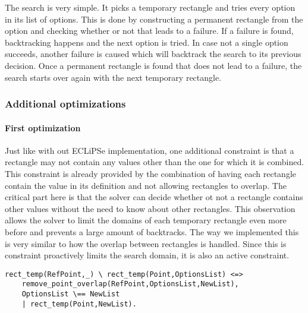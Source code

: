 The search is very simple. It picks a temporary rectangle and tries every option in its list of options. This is done by constructing a permanent rectangle from the option and checking whether or not that leads to a failure. If a failure is found, backtracking happens and the next option is tried. In case not a single option succeeds, another failure is caused which will backtrack the search to its previous decision. Once a permanent rectangle is found that does not lead to a failure, the search starts over again with the next temporary rectangle.


\subsubsection{Additional optimizations}
\paragraph{First optimization}
\label{sec:CHR_opti}
Just like with out ECLiPSe implementation, one additional constraint is that a rectangle may not contain any values other than the one for which it is combined. This constraint is already provided by the combination of having each rectangle contain the value in its definition and not allowing rectangles to overlap. The critical part here is that the solver can decide whether ot not a rectangle contains other values without the need to know about other rectangles. This observation allows the solver to limit the domains of each temporary rectangle even more before and prevents a large amount of backtracks. The way we implemented this is very similar to how the overlap between rectangles is handled. Since this is constraint proactively limits the search domain, it is also an active constraint.

\begin{lstlisting}
rect_temp(RefPoint,_) \ rect_temp(Point,OptionsList) <=>
	remove_point_overlap(RefPoint,OptionsList,NewList),
	OptionsList \== NewList
	| rect_temp(Point,NewList).
\end{lstlisting}

